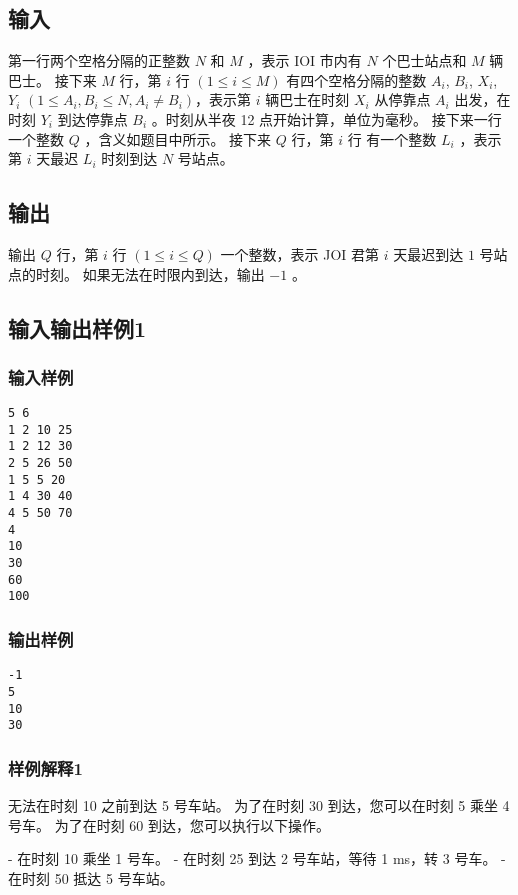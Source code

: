 \documentclass[UTF8]{ctexart}
\begin{document}
\subsection{输入}

第一行两个空格分隔的正整数 $N$ 和 $M$ ，表示 IOI 市内有 $N$ 个巴士站点和 $M$ 辆巴士。
接下来 $M$ 行，第 $i$ 行 $(1\le i\le M)$ 有四个空格分隔的整数 $A_i$, $B_i$, $X_i$, $Y_i$ $(1\le A_i,B_i\le N, A_i\neq B_i)$，表示第 $i$ 辆巴士在时刻 $X_i$ 从停靠点 $A_i$ 出发，在时刻 $Y_i$ 到达停靠点 $B_i$ 。时刻从半夜 12 点开始计算，单位为毫秒。
接下来一行一个整数 $Q$ ，含义如题目中所示。
接下来 $Q$ 行，第 $i$ 行  有一个整数 $L_i$ ，表示第 $i$ 天最迟 $L_i$ 时刻到达 $N$ 号站点。

\subsection{输出}

输出 $Q$ 行，第 $i$ 行 $(1\le i\le Q)$ 一个整数，表示 JOI 君第 $i$ 天最迟到达 $1$ 号站点的时刻。 如果无法在时限内到达，输出 $-1$ 。

\subsection{输入输出样例1}


\subsubsection{输入样例}

\begin{lstlisting}
5 6
1 2 10 25
1 2 12 30
2 5 26 50
1 5 5 20
1 4 30 40
4 5 50 70
4
10
30
60
100
\end{lstlisting}


\subsubsection{输出样例}

\begin{lstlisting}
-1
5
10
30
\end{lstlisting}


\subsubsection{样例解释1}

无法在时刻 10 之前到达 5 号车站。 为了在时刻 30 到达，您可以在时刻 5 乘坐 4 号车。 为了在时刻 60 到达，您可以执行以下操作。

- 在时刻 10 乘坐 1 号车。
- 在时刻 25 到达 2 号车站，等待 1 ms，转 3 号车。
- 在时刻 50 抵达 5 号车站。
\end{document}
